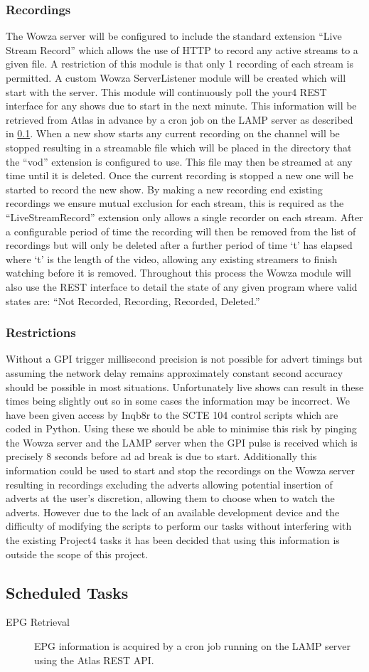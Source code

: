 \subsubsection{Recordings}
The Wowza server will be configured to include the standard extension ``Live Stream Record'' which allows the use of HTTP to record any active streams to a given file. A restriction of this module is that only 1 recording of each stream is permitted. A custom Wowza ServerListener module will be created which will start with the server. This module will continuously poll the your4 REST interface for any shows due to start in the next minute. This information will be retrieved from Atlas in advance by a cron job on the LAMP server as described in \ref{subsec:ScheduledTasks}. When a new show starts any current recording on the channel will be stopped resulting in a streamable file which will be placed in the directory that the ``vod'' extension is configured to use. This file may then be streamed at any time until it is deleted. Once the current recording is stopped a new one will be started to record the new show. By making a new recording end existing recordings we ensure mutual exclusion for each stream, this is required as the ``LiveStreamRecord'' extension only allows a single recorder on each stream. After a configurable period of time the recording will then be removed from the list of recordings but will only be deleted after a further period of time `t' has elapsed where `t' is the length of the video, allowing any existing streamers to finish watching before it is removed. Throughout this process the Wowza module will also use the REST interface to detail the state of any given program where valid states are: ``Not Recorded, Recording, Recorded, Deleted.''

\subsubsection{Restrictions}
Without a GPI trigger millisecond precision is not possible for advert timings but assuming the network delay remains approximately constant second accuracy should be possible in most situations. Unfortunately live shows can result in these times being slightly out so in some cases the information may be incorrect. We have been given access by Inqb8r to the SCTE 104 control scripts which are coded in Python. Using these we should be able to minimise this risk by pinging the Wowza server and the LAMP server when the GPI pulse is received which is precisely 8 seconds before ad ad break is due to start. Additionally this information could be used to start and stop the recordings on the Wowza server resulting in recordings excluding the adverts allowing potential insertion of adverts at the user's discretion, allowing them to choose when to watch the adverts. However due to the lack of an available development device and the difficulty of modifying the scripts to perform our tasks without interfering with the existing Project4 tasks it has been decided that using this information is outside the scope of this project.

\subsection{Scheduled Tasks}\label{subsec:ScheduledTasks}
\begin{description}
\item[EPG Retrieval]{EPG information is acquired by a cron job running on the LAMP server using the Atlas REST API.}
\end{description}

